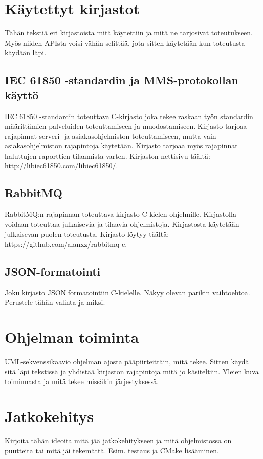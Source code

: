 \section{Käytettyt kirjastot}
\begin{it}
	Tähän tekstiä eri kirjastoista mitä käytettiin ja mitä ne tarjosivat toteutukseen. Myös niiden APIsta voisi vähän selittää, jota sitten käytetään kun toteutusta käydään läpi.
\end{it}


\subsection{IEC 61850 -standardin ja MMS-protokollan käyttö}
\begin{it}
	IEC 61850 -standardin toteuttava C-kirjasto joka tekee raskaan työn standardin määrittämien palveluiden toteuttamiseen ja muodostamiseen. Kirjasto tarjoaa rajapinnat serveri- ja asiakasohjelmiston toteuttamiseen, mutta vain asiakasohjelmiston rajapintoja käytetään. Kirjasto tarjoaa myös rajapinnat haluttujen raporttien tilaamista varten. Kirjaston nettisivu täältä: http://libiec61850.com/libiec61850/.
\end{it}


\subsection{RabbitMQ}
\begin{it}
	RabbitMQ:n rajapinnan toteuttava kirjasto C-kielen ohjelmille. Kirjastolla voidaan toteuttaa julkaisevia ja tilaavia ohjelmistoja. Kirjastosta käytetään julkaisevan puolen toteutusta. Kirjasto löytyy täältä: https://github.com/alanxz/rabbitmq-c.
\end{it}


\subsection{JSON-formatointi}
\begin{it}
	Joku kirjasto JSON formatointiin C-kielelle. Näkyy olevan parikin vaihtoehtoa. Perustele tähän valinta ja miksi.
\end{it}


\section{Ohjelman toiminta}
\begin{it}
	UML-sekvenssikaavio ohjelman ajosta pääpiirteittäin, mitä tekee. Sitten käydä sitä läpi tekstissä ja yhdistää kirjaston rajapintoja mitä jo käsiteltiin. Yleien kuva toiminnasta ja mitä tekee missäkin järjestyksessä.
\end{it}


\section{Jatkokehitys}
\begin{it}
	Kirjoita tähän ideoita mitä jää jatkokehitykseen ja mitä ohjelmistossa on puutteita tai mitä jäi tekemättä. Esim. testaus ja CMake lisääminen.
\end{it}
